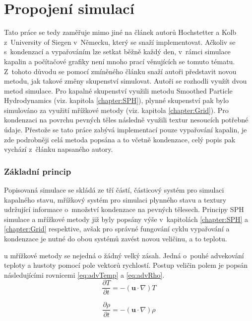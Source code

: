 \section{Propojení simulací}
\label{chapter:evap}
Tato práce se tedy zaměřuje mimo jiné na článek \cite{Evap&Cond} autorů Hochstetter a Kolb z~University of Siegen v~Německu, který se snaží implementovat. Ačkoliv se s~kondenzací a vypařováním lze setkat běžně každý den, v~rámci simulace kapalin a počítačové grafiky není mnoho prací věnujících se tomuto tématu. Z~tohoto důvodu se pomocí zmíněného článku snaží autoři představit novou metodu, jak takové změny skupenství simulovat. Autoři se rozhodli využít dvou metod simulace. Pro kapalné skupenství využili metodu Smoothed Particle Hydrodynamics (viz. kapitola \ref{chapter:SPH}), plynné skupenství pak bylo simulováno za využití mřížkové metody (viz. kapitola \ref{chapter:Grid}). Pro kondenzaci na povrchu pevných těles následně využili textur nesoucích potřebné údaje. Přestože se tato práce zabývá implementací pouze vypařování kapalin, je zde podrobněji celá metoda popsána a to včetně kondenzace, celý popis pak vychází z~článku napsaného autory. \cite{Evap&Cond}

\subsubsection{Základní princip}
Popisovaná simulace se skládá ze tří částí, částicový systém pro simulaci kapalného stavu, mřížkový systém pro simulaci plynného stavu a textury udržující informace o~množství kondenzace na pevných tělesech. Principy SPH simulace a mřížkové metody již byly popsány výše v~kapitolách \ref{chapter:SPH} a \ref{chapter:Grid} respektive, avšak pro správné fungování cyklu vypařování a kondenzace je nutné do obou systémů zavést novou veličinu, a to teplotu.

u mřížkové metody se nejedná o žádný velký zásah. Jedná o~pouhé advekování teploty a hustoty pomocí pole vektorů rychlostí. Postup veličin polem je popsán následujícími rovnicemi \ref{eq:advTemp} a \ref{eq:advRho}.
\begin{equation}
	\frac{\partial T}{\partial t} = -(\mathbf{u} \cdot \nabla)T
	\label{eq:advTemp}
\end{equation}

\begin{equation}
	\frac{\partial \rho}{\partial t} = -(\mathbf{u} \cdot \nabla)\rho
	\label{eq:advRho}
\end{equation}

